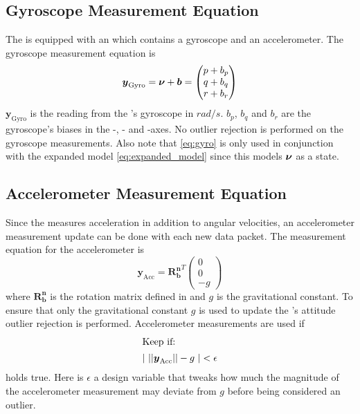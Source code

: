 \subsection{Gyroscope Measurement Equation}
The \abbrROV is equipped with an \abbrIMU which contains a gyroscope and an accelerometer. The gyroscope measurement equation is 
\begin{equation}\label{eq:gyro}
\boldsymbol{y}_\text{Gyro}= \boldsymbol{\nu} + \boldsymbol{b} =
 \begin{pmatrix}
p + b_p\\
q + b_q\\
r + b_r
\end{pmatrix}
\end{equation}
 $\boldsymbol{y}_\text{Gyro}$ is the reading from the \abbrIMU's gyroscope in $rad/s$. $b_p$, $b_q$ and $b_r$ are the gyroscope's biases in the \xPosition-, \yPosition- and \zPosition-axes. No outlier rejection is performed on the gyroscope measurements. Also note that \eqref{eq:gyro} is only used in conjunction with the expanded model \eqref{eq:expanded_model} since this models $\boldsymbol{\nu}$ as a state. 

\subsection{Accelerometer Measurement Equation}
Since the \abbrIMU measures acceleration in addition to angular velocities, an accelerometer measurement update can be done with each new \abbrIMU data packet. The measurement equation for the accelerometer is
\begin{equation}
\boldsymbol{y}_{\text{Acc}} =
    \boldsymbol{R^n_b}^T
    \begin{pmatrix}
    0\\
    0\\
    -g
    \end{pmatrix}
\end{equation}
    where $\boldsymbol{R^n_b}$ is the rotation matrix defined in  and $g$ is the gravitational constant. To ensure that only the gravitational constant $g$ is used to update the \abbrROV's attitude outlier rejection is performed. Accelerometer measurements are used if 
\begin{align*}
    \intertext{Keep if: }
    |~||
    \boldsymbol{y}_{\text{Acc}}
||
    -g
     ~| < \epsilon
\end{align*} holds true.
Here is $\epsilon$ a design variable that tweaks how much the magnitude of the accelerometer measurement may deviate from $g$ before being considered an outlier.

